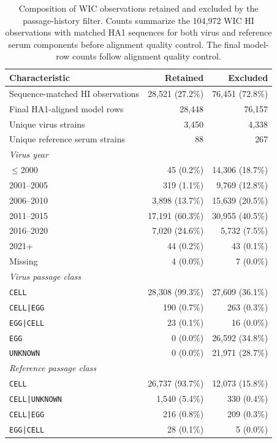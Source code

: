 \begin{table}[!h]
\centering
\caption{Composition of WIC observations retained and excluded by the passage-history filter. Counts summarize the 104,972 WIC HI observations with matched HA1 sequences for both virus and reference serum components before alignment quality control. The final model-row counts follow alignment quality control.}
\label{tab:si-wic-filter-summary}
\footnotesize
\begin{tabular*}{\textwidth}{@{\extracolsep{\fill}}lrr}
\toprule
Characteristic & Retained & Excluded \\
\midrule
Sequence-matched HI observations & 28,521 (27.2\%) & 76,451 (72.8\%) \\
Final HA1-aligned model rows & 28,448 & 76,157 \\
Unique virus strains & 3,450 & 4,338 \\
Unique reference serum strains & 88 & 267 \\
\midrule
\multicolumn{3}{l}{\textit{Virus year}} \\
$\leq$2000 & 45 (0.2\%) & 14,306 (18.7\%) \\
2001--2005 & 319 (1.1\%) & 9,769 (12.8\%) \\
2006--2010 & 3,898 (13.7\%) & 15,639 (20.5\%) \\
2011--2015 & 17,191 (60.3\%) & 30,955 (40.5\%) \\
2016--2020 & 7,020 (24.6\%) & 5,732 (7.5\%) \\
2021+ & 44 (0.2\%) & 43 (0.1\%) \\
Missing & 4 (0.0\%) & 7 (0.0\%) \\
\midrule
\multicolumn{3}{l}{\textit{Virus passage class}} \\
\texttt{CELL} & 28,308 (99.3\%) & 27,609 (36.1\%) \\
\texttt{CELL|EGG} & 190 (0.7\%) & 263 (0.3\%) \\
\texttt{EGG|CELL} & 23 (0.1\%) & 16 (0.0\%) \\
\texttt{EGG} & 0 (0.0\%) & 26,592 (34.8\%) \\
\texttt{UNKNOWN} & 0 (0.0\%) & 21,971 (28.7\%) \\
\midrule
\multicolumn{3}{l}{\textit{Reference passage class}} \\
\texttt{CELL} & 26,737 (93.7\%) & 12,073 (15.8\%) \\
\texttt{CELL|UNKNOWN} & 1,540 (5.4\%) & 330 (0.4\%) \\
\texttt{CELL|EGG} & 216 (0.8\%) & 209 (0.3\%) \\
\texttt{EGG|CELL} & 28 (0.1\%) & 5 (0.0\%) \\

\end{tabular*}
\end{table}
